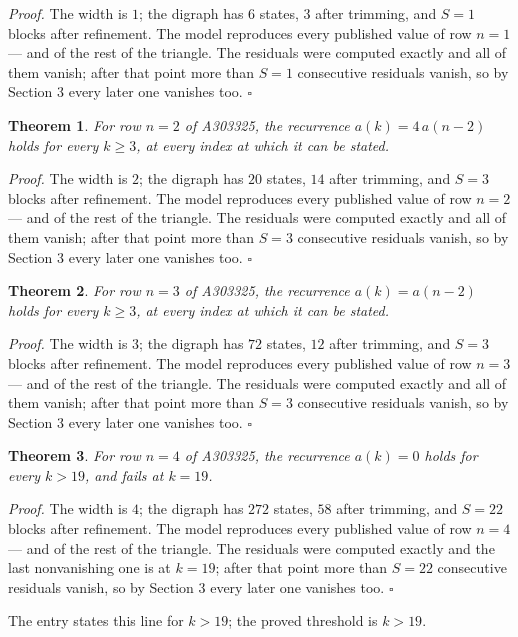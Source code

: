 \documentclass[11pt]{article}
\newtheorem{theorem}{Theorem}
\theoremstyle{definition}
\begin{document}
{\itshape Proof.} The width is $1$; the digraph has $6$ states, $3$ after trimming, and $S = 1$ blocks after refinement. The model reproduces every published value of row $n = 1$ --- and of the rest of the triangle. The residuals were computed exactly and all of them vanish; after that point more than $S = 1$ consecutive residuals vanish, so by Section 3 every later one vanishes too. $\square$

\begin{theorem} For row $n = 2$ of A303325, the recurrence $a(k) = 4\,a(n-2)$ holds for every $k \ge 3$, at every index at which it can be stated.\end{theorem}

{\itshape Proof.} The width is $2$; the digraph has $20$ states, $14$ after trimming, and $S = 3$ blocks after refinement. The model reproduces every published value of row $n = 2$ --- and of the rest of the triangle. The residuals were computed exactly and all of them vanish; after that point more than $S = 3$ consecutive residuals vanish, so by Section 3 every later one vanishes too. $\square$

\begin{theorem} For row $n = 3$ of A303325, the recurrence $a(k) = a(n-2)$ holds for every $k \ge 3$, at every index at which it can be stated.\end{theorem}

{\itshape Proof.} The width is $3$; the digraph has $72$ states, $12$ after trimming, and $S = 3$ blocks after refinement. The model reproduces every published value of row $n = 3$ --- and of the rest of the triangle. The residuals were computed exactly and all of them vanish; after that point more than $S = 3$ consecutive residuals vanish, so by Section 3 every later one vanishes too. $\square$

\begin{theorem} For row $n = 4$ of A303325, the recurrence $a(k) = 0$ holds for every $k > 19$, and fails at $k = 19$.\end{theorem}

{\itshape Proof.} The width is $4$; the digraph has $272$ states, $58$ after trimming, and $S = 22$ blocks after refinement. The model reproduces every published value of row $n = 4$ --- and of the rest of the triangle. The residuals were computed exactly and the last nonvanishing one is at $k = 19$; after that point more than $S = 22$ consecutive residuals vanish, so by Section 3 every later one vanishes too. $\square$

The entry states this line for $k > 19$; the proved threshold is $k > 19$.
\end{document}
